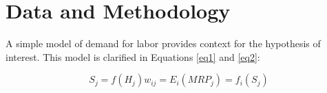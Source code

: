 \documentclass[review]{elsarticle}
\begin{document}



\section{Data and Methodology}

A simple model of demand for labor provides context for the hypothesis of interest.
This model is clarified in Equations \ref{eq1} and \ref{eq2}:

\begin{subequations}
    \begin{equation}
        S_j = f(H_j)
        \label{eq1}
    \end{equation}
    \begin{equation}
        w_{ij} = E_i(MRP_j) = f_i(S_j)
        \label{eq2}
    \end{equation}
\end{subequations}
\end{document}
